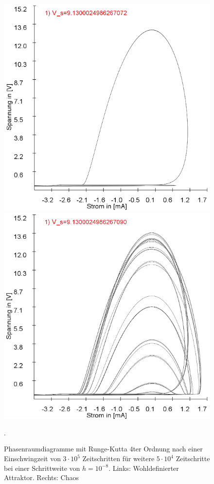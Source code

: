\documentclass[12pt,a4paper]{article}
\begin{document}
\begin{figure}[!htbp]
\centering
\includegraphics[scale=0.33]{schwing-runge-nach300k-weitere50k-10-8-searching-chaos1}
\includegraphics[scale=0.33]{schwing-runge-nach300k-weitere50k-10-8-finding-chaos1}
\caption{Phasenraumdiagramme mit Runge-Kutta 4ter Ordnung nach einer Einschwingzeit von  $3\cdot10^5$ Zeitschritten für weitere $5\cdot10^4$ Zeitschritte bei einer Schrittweite von $h=10^{-8}$. Links: Wohldefinierter Attraktor. Rechts: Chaos}. 
\label{fig:ldr-0004}
\end{figure}
\end{document}
